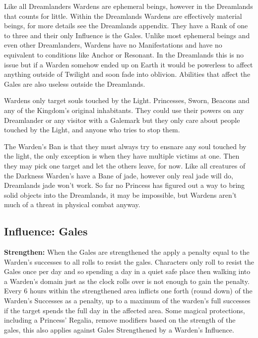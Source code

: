 Like all Dreamlanders Wardens are ephemeral beings, however in the Dreamlands that counts for little. Within the Dreamlands Wardens are effectively material beings, for more details see the Dreamlands appendix. They have a Rank of one to three and their only Influence is the Gales. Unlike most ephemeral beings and even other Dreamlanders, Wardens have no Manifestations and have no equivalent to conditions like Anchor or Resonant. In the Dreamlands this is no issue but if a Warden somehow ended up on Earth it would be powerless to affect anything outside of Twilight and soon fade into oblivion. Abilities that affect the Gales are also useless outside the Dreamlands.

Wardens only target souls touched by the Light. Princesses, Sworn, Beacons and any of the Kingdom's original inhabitants. They could use their powers on any Dreamlander or any visitor with a Galemark but they only care about people touched by the Light, and anyone who tries to stop them. 

The Warden's Ban is that they must always try to ensnare any soul touched by the light, the only exception is when they have multiple victims at one. Then they may pick one target and let the others leave, for now. Like all creatures of the Darkness Warden's have a Bane of jade, however only real jade will do, Dreamlands jade won't work. So far no Princess has figured out a way to bring solid objects into the Dreamlands, it may be impossible, but Wardens aren't much of a threat in physical combat anyway. 

\subsection*{Influence: Gales}

\noindent \textbf{Strengthen:} When the Gales are strengthened the apply a penalty equal to the Warden's successes to all rolls to resist the gales. Characters only roll to resist the Gales once per day and so spending a day in a quiet safe place then walking into a Warden's domain just as the clock rolls over is not enough to gain the penalty. Every 6 hours within the strengthened area inflicts one forth (round down) of the Warden's Successes as a penalty, up to a maximum of the warden's full successes if the target spends the full day in the affected area. Some magical protections, including a Princess' Regalia, remove modifiers based on the strength of the gales, this also applies against Gales Strengthened by a Warden's Influence. 


